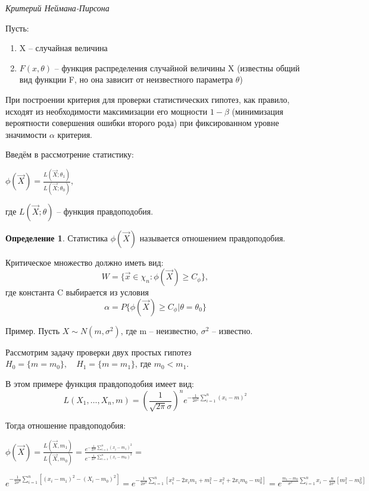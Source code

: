 \documentclass[a4paper, 12pt]{article}
\theoremstyle{definition}
\newtheorem{definition}{Определение}[section]
\theoremstyle{leads}
\theoremstyle{example}
\theoremstyle{remark}
\begin{document}
\emph{Критерий Неймана-Пирсона}	


Пусть:
\begin{enumerate}
	\item X -- случайная величина
	\item $F(x, \theta)$ -- функция распределения случайной величины X
	 (известны общий вид функции F, но она зависит от неизвестного параметра $\theta$)
\end{enumerate}

	При построении критерия для проверки статистических гипотез, как правило, исходят из необходимости максимизации его мощности  $1 - \beta$ (минимизация вероятности совершения ошибки второго рода) при фиксированном уровне значимости $\alpha$ критерия.
	
	Введём в рассмотрение статистику:
	 
	 \begin{center}
	 	\centering
	 	$\phi(\vec{X}) = \frac{L(\vec{X}; \theta_1)}{L(\vec{X}; \theta_0)}$,
	 \end{center}
 где  $L(\vec{X}; \theta)$ -- функция правдоподобия.

\begin{definition}
 Статистика $\phi(\vec{X})$ называется отношением правдоподобия. 	
\end{definition}
 
Критическое множество должно иметь вид: 
\begin{equation*}
	W = \{\vec{x} \in \chi_n: \phi(\vec{X}) \geq C_{\phi}\},
\end{equation*}
где константа C выбирается из условия 
\begin{equation*}
	\alpha = P\{\phi(\vec{X}) \geq C_{\phi} | \theta = \theta_0\}
\end{equation*}

Пример. Пусть $X \sim N(m, \sigma^2)$, где m -- неизвестно, $\sigma^2$ -- известно.

Рассмотрим задачу проверки двух простых гипотез 
$H_0 = \{m = m_0\}, \quad H_1 = \{m = m_1\}$, где $m_0 < m_1$.

В этом примере функция правдоподобия имеет вид:
\begin{equation*}
L(X_1, \dots, X_n, m) = (\frac{1}{\sqrt{2 \pi} \sigma})^n e^{- \frac{1}{2 \sigma^2} \sum_{i=1}^{n}(x_i - m)^2}
\end{equation*}

Тогда отношение правдоподобия:

\begin{center}
	\centering
	$\phi(\vec{X}) = \frac{L(\vec{X}, m_1)}{L(\vec{X},m_0)} = 
	\frac{e^{- \frac{1}{2 \sigma^2} \sum_{i=1}^{n}(x_i - m_1)^2}}{e^{- \frac{1}{2 \sigma^2} \sum_{i=1}^{n}(x_i - m_0)^2}} = $
\end{center}
\begin{equation}
	e^{- \frac{1}{2\sigma^2} \sum_{i=1}^{n} [(x_i - m_1)^2 - (X_i - m_0)^2]} = e^{-\frac{1}{2\sigma^2} \sum_{i=1}^{n} [x_i^2 - 2x_im_1 + m_1^2 - x_i^2 + 2x_im_0 - m_0^2]} = e^{\frac{m_1 - m_0}{\sigma^2} \sum_{i=1}^{n}x_i - \frac{n}{2\sigma^2}[m_1^2 - m_0^2]}
\end{equation}
\end{document}
